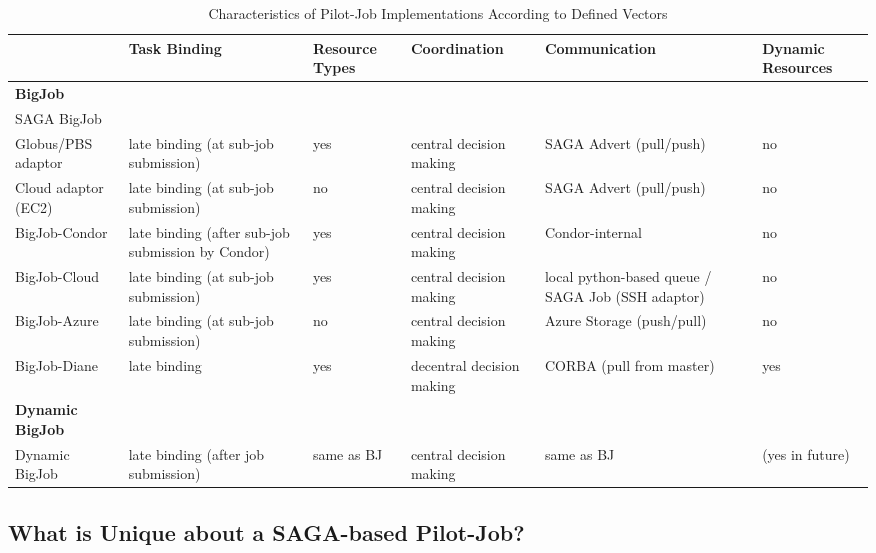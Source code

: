 \documentclass[conference,final]{IEEEtran}
\begin{document}
\begin{table}[t]
\centering
\begin{tabular}{|l|p{2.5cm}|p{2cm}|p{2cm}|p{2cm}|p{2cm}|}
	\hline
	&\textbf{Task Binding} &\textbf{Resource Types} &\textbf{Coordina\-tion} & \textbf{Communica\-tion} &\textbf{Dynamic Resources}\\
	\hline
	\textbf{BigJob} & &&&&\\
	\hline
	SAGA BigJob & &&&&\\
	\hline
	\hspace{4mm} Globus/PBS adaptor  &late binding (at sub-job submission)  
									 &yes &central decision making &SAGA Advert (pull/push) &no\\  
	\hline
	\hspace{4mm} Cloud adaptor (EC2) &late binding (at sub-job submission)  
									 &no &central decision making &SAGA Advert (pull/push) &no\\ 
    \hline
   BigJob-Condor &late binding (after sub-job submission by Condor) &yes &central decision making &Condor-internal &no\\
	\hline
 	BigJob-Cloud &late binding (at sub-job submission) &yes &central decision making 
				 &local python-based queue / SAGA Job (SSH adaptor) &no\\ 
	\hline
	BigJob-Azure &late binding (at sub-job submission)
	             &no &central decision making &Azure Storage (push/pull) &no\\ 
	\hline
    BigJob-Diane &late binding  &yes &decentral decision making &CORBA (pull from master) &yes\\ 
	\hline	
	\textbf{Dynamic BigJob} & &&&&\\
	\hline
    Dynamic BigJob &late binding (after job submission) &same as BJ &central decision making &same as BJ &(yes in future)\\
    \hline
\end{tabular}
\caption{Characteristics of Pilot-Job Implementations According 
		to Defined Vectors} \label{tab:pilotjob_overview}
\end{table}		


\subsection{What is Unique about a SAGA-based Pilot-Job?}
\end{document}
